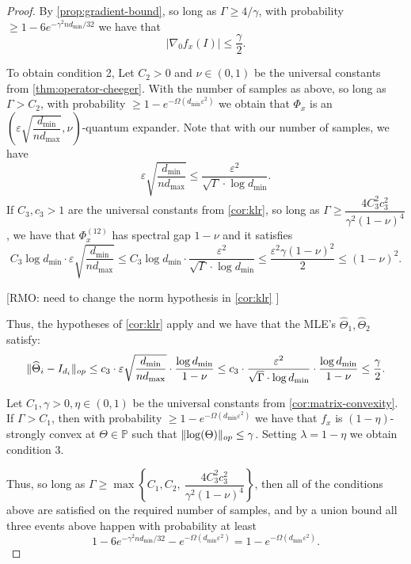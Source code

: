 \documentclass[aos]{imsart}
\theoremstyle{definition}
\numberwithin{equation}{section}
\DeclarePairedDelimiter{\norm}{\lVert}{\rVert}
\newcommand{\htheta}{\widehat{\Theta}}
\newcommand{\SPD}{\mathbb{P}}
\def\dmin{d_{\min}}
\def\dmax{d_{\max}}
\newcommand{\RMO}[1]{{\color{red}[RMO: #1]}}
\begin{document}
\begin{proof}
By \cref{prop:gradient-bound}, so long as $\Gamma \geq 4/\gamma$, with probability $\geq 1 - 6 e^{- \gamma^2 n \dmin/32}$ we have that 
$$ |\nabla_0 f_x(I)| \leq  \frac{\gamma}{2}. $$ 

To obtain condition 2, Let $C_2 > 0$ and $\nu \in (0,1)$ be the universal constants from \cref{thm:operator-cheeger}.
With the number of samples as above, so long as $\Gamma > C_2$, with probability $\geq 1 - e^{- \Omega(\dmin \varepsilon^2)}$ we obtain that 
$\Phi_x$ is an $\left(\varepsilon \sqrt{\dfrac{\dmin}{n \dmax}}, \nu \right)$-quantum expander. Note that with our number of samples, we have
$$ \varepsilon \sqrt{\dfrac{\dmin}{n \dmax}} \leq \dfrac{\varepsilon^2}{\sqrt{\Gamma} \cdot \log \dmin}.  $$
If $C_3, c_3 > 1$ are the universal constants from \cref{cor:klr}, so long as 
$\Gamma \geq \dfrac{4 C_3^2 c_3^2}{\gamma^2 (1-\nu)^4}$, we have that
$\Phi_x^{(12)}$ has spectral gap $1 - \nu$ and it satisfies
$$ C_3 \log \dmin \cdot \varepsilon \sqrt{\dfrac{\dmin}{n \dmax}} \leq C_3 \log \dmin \cdot  \dfrac{\varepsilon^2}{\sqrt{\Gamma} \cdot \log \dmin} \leq \dfrac{\varepsilon^2 \gamma (1-\nu)^2}{2} \leq (1-\nu)^2. $$

\RMO{need to change the norm hypothesis in \cref{cor:klr} }

Thus, the hypotheses of \cref{cor:klr} apply and we have that the MLE's $\htheta_1, \htheta_2$ satisfy: 
$$ \norm{\htheta_i - I_{d_i}}_{op} \leq c_3 \cdot \varepsilon \sqrt{\dfrac{\dmin}{n \dmax}} \cdot \dfrac{\log \dmin}{1-\nu} \leq c_3 \cdot \dfrac{\varepsilon^2}{\sqrt{\Gamma} \cdot \log \dmin} \cdot \dfrac{\log \dmin}{1-\nu} \leq \dfrac{\gamma}{2}. $$

Let $C_1, \gamma > 0, \eta \in (0,1)$ be the universal constants from \cref{cor:matrix-convexity}. 
If $\Gamma > C_1$, then with probability 
$\geq 1 - e^{- \Omega(\dmin \varepsilon^2)}$ we have that $f_x$ is
$(1-\eta)$-strongly convex at $\Theta \in \SPD$ such that 
$\norm{\log(\Theta)}_{op} \leq \gamma$. Setting $\lambda = 1-\eta$ we obtain condition 3.

Thus, so long as $\Gamma \geq \max\left\{ C_1, C_2, \ \dfrac{4 C_3^2 c_3^2}{\gamma^2 (1-\nu)^4}  \right\}$, then all of the conditions above are satisfied on the required number of samples, and by a union bound all three events above happen with probability at least
$$ 1 - 6 e^{- \gamma^2 n \dmin/32} - e^{- \Omega(\dmin \varepsilon^2)} = 1 - e^{- \Omega(\dmin \varepsilon^2)}. $$
\end{proof}
\end{document}
